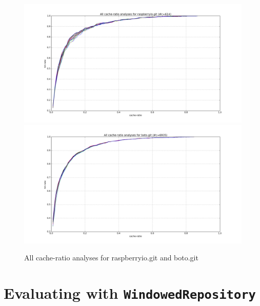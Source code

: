 \documentclass[12pt,twoside,notitlepage]{report}
\begin{document}
\begin{figure}[t!]
\includegraphics[width=1.0\textwidth]{figure_4-1.png}
\includegraphics[width=1.0\textwidth]{figure_4-2.png}
\caption{All cache-ratio analyses for raspberryio.git and boto.git}
\label{fig:plot_all}
\end{figure}
\clearpage
\section{Evaluating with \texttt{WindowedRepository}}\label{windowedrep}

\end{document}
